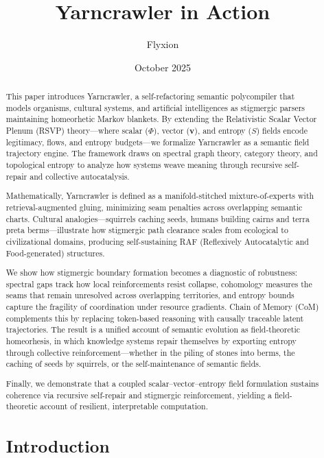 \documentclass{article}
\title{Yarncrawler in Action}
\author{Flyxion}
\date{October 2025}
\begin{document}
\maketitle

\begin{abstract}
This paper introduces Yarncrawler, a self-refactoring semantic polycompiler that models organisms, cultural systems, and artificial intelligences as stigmergic parsers maintaining homeorhetic Markov blankets. By extending the Relativistic Scalar Vector Plenum (RSVP) theory—where scalar ($\Phi$), vector ($\mathbf{v}$), and entropy ($S$) fields encode legitimacy, flows, and entropy budgets—we formalize Yarncrawler as a semantic field trajectory engine. The framework draws on spectral graph theory, category theory, and topological entropy to analyze how systems weave meaning through recursive self-repair and collective autocatalysis.

Mathematically, Yarncrawler is defined as a manifold-stitched mixture-of-experts with retrieval-augmented gluing, minimizing seam penalties across overlapping semantic charts. Cultural analogies—squirrels caching seeds, humans building cairns and terra preta berms—illustrate how stigmergic path clearance scales from ecological to civilizational domains, producing self-sustaining RAF (Reflexively Autocatalytic and Food-generated) structures.

We show how stigmergic boundary formation becomes a diagnostic of robustness: spectral gaps track how local reinforcements resist collapse, cohomology measures the seams that remain unresolved across overlapping territories, and entropy bounds capture the fragility of coordination under resource gradients. Chain of Memory (CoM) complements this by replacing token-based reasoning with causally traceable latent trajectories. The result is a unified account of semantic evolution as field-theoretic homeorhesis, in which knowledge systems repair themselves by exporting entropy through collective reinforcement—whether in the piling of stones into berms, the caching of seeds by squirrels, or the self-maintenance of semantic fields.

Finally, we demonstrate that a coupled scalar–vector–entropy field formulation sustains coherence via recursive self-repair and stigmergic reinforcement, yielding a field-theoretic account of resilient, interpretable computation.


\section{Introduction}


\end{abstract}
\end{document}
